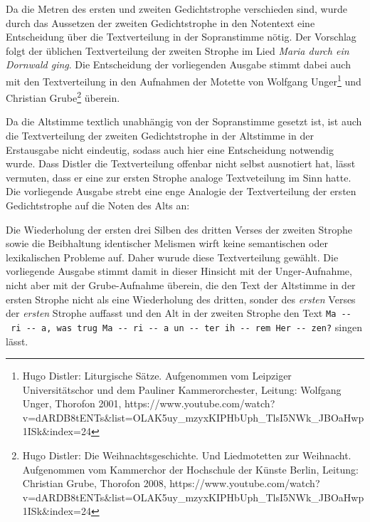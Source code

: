 \documentclass{book}
\begin{document}
\begin{multicols}{2}
Da die Metren des ersten und zweiten Gedichtstrophe verschieden sind,
wurde durch das Aussetzen der zweiten Gedichtstrophe in den Notentext
eine Entscheidung über die Textverteilung in der Sopranstimme nötig. Der
Vorschlag folgt der üblichen Textverteilung der zweiten Strophe im Lied
\emph{Maria durch ein Dornwald ging}. Die Entscheidung der vorliegenden
Ausgabe stimmt dabei auch mit den Textverteilung in den Aufnahmen der
Motette von Wolfgang Unger\footnote{Hugo Distler: Liturgische Sätze.
  Aufgenommen vom Leipziger Universitätschor und dem Pauliner
  Kammerorchester, Leitung: Wolfgang Unger, Thorofon 2001,
  https://www.youtube.com/watch?v=dARDB8tENTs\&list=OLAK5uy\_mzyxKIPHbUph\_TlsI5NWk\_JBOaHwp1ISk\&index=24}
und Christian Grube\footnote{Hugo Distler: Die Weihnachtsgeschichte. Und
  Liedmotetten zur Weihnacht. Aufgenommen vom Kammerchor der Hochschule
  der Künste Berlin, Leitung: Christian Grube, Thorofon 2008,
  https://www.youtube.com/watch?v=dARDB8tENTs\&list=OLAK5uy\_mzyxKIPHbUph\_TlsI5NWk\_JBOaHwp1ISk\&index=24}
überein.

Da die Altstimme textlich unabhängig von der Sopranstimme gesetzt ist,
ist auch die Textverteilung der zweiten Gedichtstrophe in der Altstimme
in der Erstausgabe nicht eindeutig, sodass auch hier eine Entscheidung
notwendig wurde. Dass Distler die Textverteilung offenbar nicht selbst
ausnotiert hat, lässt vermuten, dass er eine zur ersten Strophe analoge
Textveteilung im Sinn hatte. Die vorliegende Ausgabe strebt eine enge
Analogie der Textverteilung der ersten Gedichtstrophe auf die Noten des
Alts an:

Die Wiederholung der ersten drei Silben des dritten Verses der zweiten
Strophe sowie die Beibhaltung identischer Melismen wirft keine
semantischen oder lexikalischen Probleme auf. Daher wurude diese
Textverteilung gewählt. Die vorliegende Ausgabe stimmt damit in dieser
Hinsicht mit der Unger-Aufnahme, nicht aber mit der Grube-Aufnahme
überein, die den Text der Altstimme in der ersten Strophe nicht als eine
Wiederholung des dritten, sonder des \emph{ersten} Verses der
\emph{ersten} Strophe auffasst und den Alt in der zweiten Strophe den
Text
\texttt{Ma\ -\/-\ ri\ -\/-\ a,\ was\ trug\ Ma\ -\/-\ ri\ -\/-\ a\ un\ -\/-\ ter\ ih\ -\/-\ rem\ Her\ -\/-\ zen?}
singen lässt.


\end{multicols}
\end{document}

